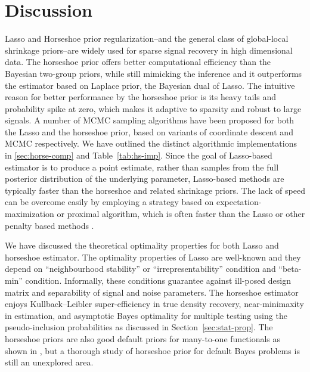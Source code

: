 \documentclass[11pt]{article}
\begin{document}


\section{Discussion}

Lasso and Horseshoe prior regularization--and the general class of global-local
shrinkage priors--are widely used for sparse signal recovery in high
dimensional data. The horseshoe prior offers better computational efficiency
than the Bayesian two-group priors, while still mimicking the inference and it
outperforms the estimator based on Laplace prior, the Bayesian dual of Lasso.
The intuitive reason for better performance by the horseshoe prior is its heavy
tails and probability spike at zero, which makes it adaptive to sparsity and
robust to large signals.  A number of MCMC sampling algorithms have been proposed
for both the Lasso and the horseshoe prior, based on variants of coordinate
descent and MCMC respectively.  We have outlined the distinct algorithmic
implementations in \ref{sec:horse-comp} and Table~\ref{tab:hs-imp}. Since the goal
of Lasso-based estimator is to produce a point estimate, rather than samples
from the full posterior distribution of the underlying parameter, Lasso-based
methods are typically faster than the horseshoe and related shrinkage priors.
The lack of speed can be overcome easily by employing a strategy based on
expectation-maximization or proximal algorithm, which is often faster than the
Lasso or other penalty based methods \citep{bhadra2017horseshoe}. 

We have discussed the theoretical optimality properties for both Lasso and
horseshoe estimator. The optimality properties of Lasso are well-known
and they depend on ``neighbourhood stability'' or ``irrepresentability'' condition
and ``beta-min'' condition. Informally, these conditions guarantee against
ill-posed design matrix and separability of signal and noise parameters. The
horseshoe estimator enjoys Kullback--Leibler super-efficiency in true density
recovery, near-minimaxity in estimation, and asymptotic Bayes optimality for
multiple testing using the pseudo-inclusion probabilities as discussed in
Section~\ref{sec:stat-prop}. The horseshoe priors are also good default priors for
many-to-one functionals as shown in \citet{bhadra2015default}, but a thorough
study of horseshoe prior for default Bayes problems is still an unexplored
area. 
\end{document}
